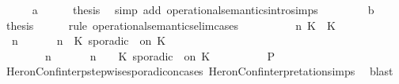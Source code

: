 \begin{isabellebody}
\ \ \ \ \isamarkupfalse%
\ a\isanewline
\ \ \ \ \isamarkupfalse%
\ {\isacharquery}thesis\ \isamarkupfalse%
\ {\isacharparenleft}simp\ add{\isacharcolon}\ operational{\isacharunderscore}semantics{\isacharunderscore}intro{\isachardot}simps{\isacharparenright}\isanewline
\ \ \isamarkupfalse%
\isanewline
\ \ \ \ \isamarkupfalse%
\ b\ \isamarkupfalse%
\ {\isacharquery}thesis\isanewline
\ \ \ \ \isamarkupfalse%
\ {\isacharparenleft}rule\ operational{\isacharunderscore}semantics{\isacharunderscore}elim{\isachardot}cases{\isacharparenright}\isanewline
\ \ \ \ \ \ \isamarkupfalse%
\ \ {\isasymGamma}\ n\ K\ {\isasymtau}\ K\ {\isasymPsi}\ {\isasymPhi}\isanewline
\ \ \ \ \ \ \isamarkupfalse%
\ {\isacartoucheopen}{\isacharparenleft}{\isasymGamma}\ n\ {\isasymturnstile}\ {\isasymPsi}\ {\isasymtriangleright}\ {\isasymPhi}\ {\isacharequal}\ {\isacharparenleft}{\isasymGamma}{\isacharcomma}\ n\ {\isasymturnstile}\ {\isacharparenleft}K\ sporadic\ {\isasymtau}\ on\ K\ {\isacharhash}\ {\isasymPsi}\ {\isasymtriangleright}\ {\isasymPhi}{\isacharparenright}{\isacartoucheclose}\isanewline
\ \ \ \ \ \ \ {\isacartoucheopen}{\isacharparenleft}{\isasymGamma}\ n\ {\isasymturnstile}\ {\isasymPsi}\ {\isasymtriangleright}\ {\isasymPhi}\ {\isacharequal}\ {\isacharparenleft}{\isasymGamma}{\isacharcomma}\ n\ {\isasymturnstile}\ {\isasymPsi}\ {\isasymtriangleright}\ {\isacharparenleft}{\isacharparenleft}K\ sporadic\ {\isasymtau}\ on\ K\ {\isacharhash}\ {\isasymPhi}{\isacharparenright}{\isacharparenright}{\isacartoucheclose}\isanewline
\ \ \ \ \ \ \isamarkupfalse%
\ {\isacharquery}P\isanewline
\ \ \ \ \ \ \ \ \isamarkupfalse%
\ HeronConf{\isacharunderscore}interp{\isacharunderscore}stepwise{\isacharunderscore}sporadicon{\isacharunderscore}cases\ HeronConf{\isacharunderscore}interpretation{\isachardot}simps\ \isamarkupfalse%
\ blast\isanewline
\ \ \ \ \isamarkupfalse%
\isanewline
\ \ \ \ \ \ \isamarkupfalse%

\end{isabellebody}
